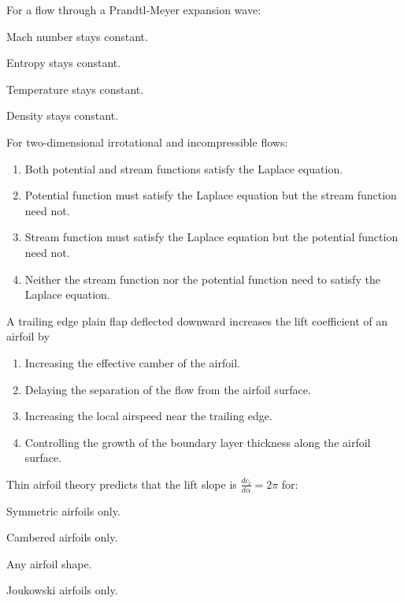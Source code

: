 \iffalse
  \author{EE24BTECH11007}
  \section{ae}
  \chapter{2009}
\fi
\item For a flow through a Prandtl-Meyer expansion wave:
\begin{enumerate}
\begin{multicols}{2}
\item Mach number stays constant.
\item Entropy stays constant.
\item Temperature stays constant.
\item Density stays constant.
\end{multicols}
\end{enumerate}
\item For two-dimensional irrotational and incompressible flows:
\begin{enumerate}
\item Both potential and stream functions satisfy the Laplace equation.
\item Potential function must satisfy the Laplace equation but the stream function need not.
\item Stream function must satisfy the Laplace equation but the potential function need not.
\item Neither the stream function nor the potential function need to satisfy the Laplace equation.
\end{enumerate}
\item A trailing edge plain flap deflected downward increases the lift coefficient of an airfoil by
\begin{enumerate}
\item Increasing the effective camber of the airfoil.
\item Delaying the separation of the flow from the airfoil surface.
\item Increasing the local airspeed near the trailing edge.
\item Controlling the growth of the boundary layer thickness along the airfoil surface.
\end{enumerate}
\item Thin airfoil theory predicts that the lift slope is $\frac{dc_l}{d\alpha}=2\pi$ for:
\begin{enumerate}
\begin{multicols}{2}
\item Symmetric airfoils only.
\item Cambered airfoils only.
\item Any airfoil shape.
\item Joukowski airfoils only.
\end{multicols}
\end{enumerate}
